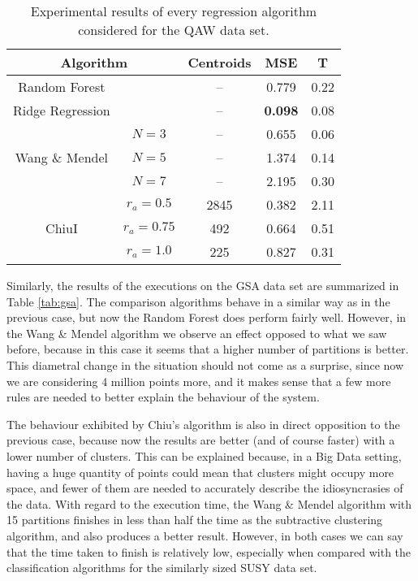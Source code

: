 \begin{table}[h!]
\centering
\caption{Experimental results of every regression algorithm considered for the QAW data set.}
\label{tab:qaw}
\begin{tabular}{ccccc}
\toprule
\multicolumn{2}{c}{Algorithm} & Centroids & MSE & T\\ \midrule
  Random Forest & & -- & 0.779 & 0.22 \\
  Ridge Regression & & -- & \textbf{0.098} &0.08\\
 \multirow{3}{*}{Wang \& Mendel} & $N=3$ & -- & 0.655 & 0.06\\
  & $N=5$ & -- & 1.374 & 0.14\\
  & $N=7$ & -- & 2.195 & 0.30\\
 \multirow{3}{*}{ChiuI} & $r_a=0.5$ &  2845 & 0.382 & 2.11\\
  & $r_a=0.75$ &  492 & 0.664 & 0.51\\
  & $r_a=1.0$ &  225 & 0.827 & 0.31\\ \bottomrule
\end{tabular}
\end{table}

Similarly, the results of the executions on the GSA data set are summarized in Table \ref{tab:gsa}. The comparison algorithms behave in a similar way as in the previous case, but now the Random Forest does perform fairly well. However, in the Wang \& Mendel algorithm we observe an effect opposed to what we saw before, because in this case it seems that a higher number of partitions is better. This diametral change in the situation should not come as a surprise, since now we are considering 4 million points more, and it makes sense that a few more rules are needed to better explain the behaviour of the system.

The behaviour exhibited by Chiu's algorithm is also in direct opposition to the previous case, because now the results are better (and of course faster) with a lower number of clusters. This can be explained because, in a Big Data setting, having a huge quantity of points could mean that clusters might occupy more space, and fewer of them are needed to accurately describe the idiosyncrasies of the data. With regard to the execution time, the Wang \& Mendel algorithm with 15 partitions finishes in less than half the time as the subtractive clustering algorithm, and also produces a better result. However, in both cases we can say that the time taken to finish is relatively low, especially when compared with the classification algorithms for the similarly sized SUSY data set.

